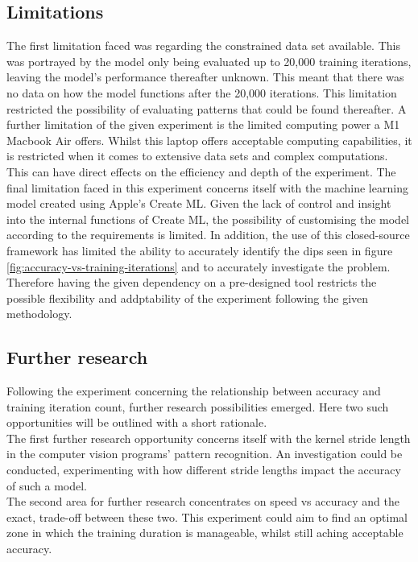 \subsection{Limitations}
The first limitation faced was regarding the constrained data set available. This was portrayed by the model only being evaluated up to 20,000 training iterations, leaving the model's performance thereafter unknown. This meant that there was no data on how the model functions after the 20,000 iterations. This limitation restricted the possibility of evaluating patterns that could be found thereafter.
A further limitation of the given experiment is the limited computing power a M1 Macbook Air offers. Whilst this laptop offers acceptable computing capabilities, it is restricted when it comes to extensive data sets and complex computations. This can have direct effects on the efficiency and depth of the experiment.
The final limitation faced in this experiment concerns itself with the machine learning model created using Apple's Create ML. 
Given the lack of control and insight into the internal functions of Create ML, the possibility of customising the model according to the
requirements is limited. In addition, the use of this closed-source framework has limited the ability to accurately identify the dips 
seen in figure \ref{fig:accuracy-vs-training-iterations} and to accurately investigate the problem. 
Therefore having the given dependency on a pre-designed tool restricts the possible flexibility and addptability of the experiment following the given methodology.  \\

\subsection{Further research}
Following the experiment concerning the relationship between accuracy and training iteration count, further research possibilities emerged. Here two such opportunities will be outlined with a short rationale.  \\

The first further research opportunity concerns itself with the kernel stride length in the computer vision programs' pattern recognition. An investigation could be conducted, experimenting with how different stride lengths impact the accuracy of such a model.   \\

The second area for further research concentrates on speed vs accuracy and the exact, trade-off between these two. This experiment could aim to find an optimal zone in which the training duration is manageable, whilst still aching acceptable accuracy.   \\




